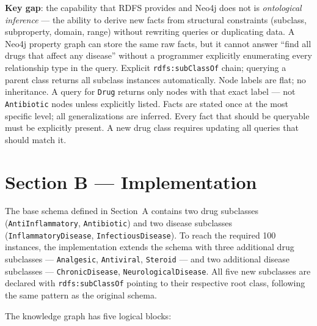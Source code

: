 \documentclass[11pt,a4paper]{article}
\begin{document}
\noindent \textbf{Key gap}: the capability that RDFS provides and Neo4j does not is
\emph{ontological inference} — the ability to derive new facts from structural
constraints (subclass, subproperty, domain, range) without rewriting queries
or duplicating data.  A Neo4j property graph can store the same raw facts, but
it cannot answer ``find all drugs that affect any disease'' without a
programmer explicitly enumerating every relationship type in the query.
Explicit \texttt{rdfs:subClassOf} chain; querying a parent class returns all
  subclass instances automatically.
Node labels are flat; no inheritance.  A query for \texttt{Drug} returns only
  nodes with that exact label — not \texttt{Antibiotic} nodes unless explicitly
  listed.
Facts are stated once at the most specific level; all generalizations are inferred. 
Every fact that should be queryable must be explicitly present.  A new drug class requires updating all queries that should match it.




\newpage
\section{Section B — Implementation}
\label{sec:implementation}

The base schema defined in Section~A contains two drug subclasses
(\texttt{AntiInflammatory}, \texttt{Antibiotic}) and two disease subclasses
(\texttt{InflammatoryDisease}, \texttt{InfectiousDisease}).  To reach the
required 100 instances, the implementation extends the schema with three
additional drug subclasses — \texttt{Analgesic}, \texttt{Antiviral},
\texttt{Steroid} — and two additional disease subclasses —
\texttt{ChronicDisease}, \texttt{NeurologicalDisease}.  All five new subclasses
are declared with \texttt{rdfs:subClassOf} pointing to their respective root
class, following the same pattern as the original schema.

The knowledge graph has five logical blocks:
\end{document}
